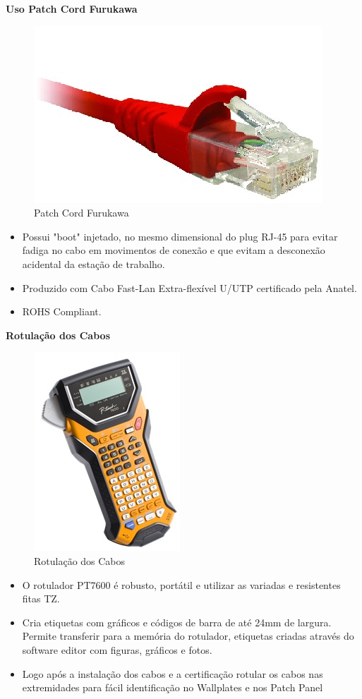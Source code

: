 \documentclass[	DIV=calc,%
							paper=a4,%
							fontsize=12pt,%
							onecolumn]{scrartcl}	 					%
\begin{document}
\textbf{Uso Patch Cord Furukawa}

\begin{figure}[!h]
	\centering
	\caption{Patch Cord Furukawa}
	\includegraphics{patch_cord_cat6_1}
\end{figure}

\begin{itemize}
	\item Possui "boot" injetado, no mesmo dimensional do plug RJ-45 para evitar fadiga no cabo em movimentos de conexão e que evitam a desconexão acidental da estação de trabalho. 
	\item Produzido com Cabo Fast-Lan Extra-flexível U/UTP certificado pela Anatel.
	\item ROHS Compliant.
\end{itemize}

\textbf{Rotulação dos Cabos}

\begin{figure}[!h]
	\centering
	\caption{Rotulação dos Cabos}
	\includegraphics{rotulador_1}
\end{figure}

\begin{itemize}
	\item O rotulador PT7600 é robusto, portátil e utilizar as variadas e resistentes fitas TZ.
	\item Cria etiquetas com gráficos e códigos de barra de até 24mm de largura. Permite transferir para a memória do rotulador, etiquetas criadas através do software editor com figuras, gráficos e fotos.
	\item Logo após a instalação dos cabos e a certificação rotular os cabos nas extremidades para fácil identificação no Wallplates e nos Patch Panel
\end{itemize}
\end{document}
